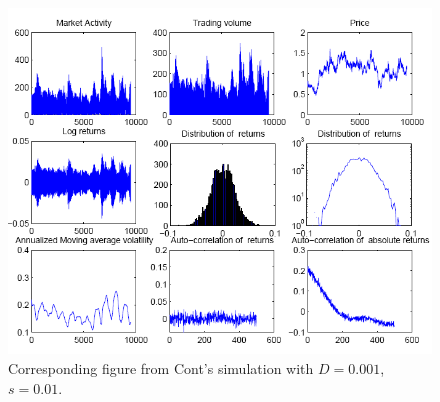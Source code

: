 \documentclass[runningheads]{llncs}
\begin{document}
\begin{figure}[htbp]
  \begin{center}
    \includegraphics[width=1.00\textwidth]{../graphics/Cont-Fig3.png}
    \caption{Corresponding figure from Cont's simulation with $D=0.001$, $s=0.01$.}
    \label{fig:ContFig3}
  \end{center}
\end{figure}
\end{document}
